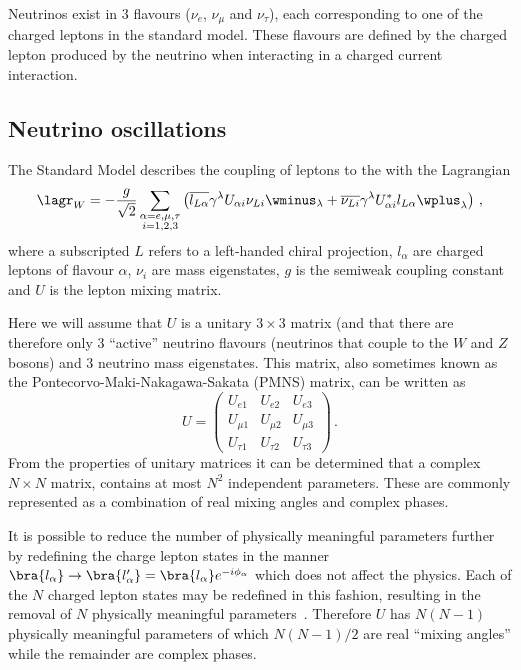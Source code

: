 Neutrinos exist in 3 flavours ($\nu_{e}$, $\nu_{\mu}$ and $\nu_{\tau}$), each corresponding to one of the charged leptons in the standard model.
These flavours are defined by the charged lepton produced by the neutrino when interacting in a charged current interaction.

\subsection{Neutrino oscillations}
\label{sec:theory:theory:oscillations}


The Standard Model describes the coupling of leptons to the \wboson with the Lagrangian
\begin{equation}
  \lagr_{W} = - \frac{g}{\sqrt{2}} \sum_{\substack{\alpha = e, \mu, \tau \\ i = 1, 2, 3}}
  \left( \overline{l_{L\alpha}} \gamma^{\lambda} U_{\alpha i} \nu_{Li} \wminus_{\lambda} +
  \overline{\nu_{Li}} \gamma^{\lambda} U^{*}_{\alpha i} l_{L\alpha} \wplus_{\lambda} \right) \, ,
  \label{eq:lagr}
\end{equation}
where a subscripted $L$ refers to a left-handed chiral projection, $l_{\alpha}$ are charged leptons of flavour $\alpha$, $\nu_{i}$ are mass eigenstates, $g$ is the semiweak coupling constant and $U$ is the lepton mixing matrix.

Here we will assume that $U$ is a unitary $3 \times 3$ matrix (and that there are therefore only 3 ``active'' neutrino flavours (neutrinos that couple to the $W$ and $Z$ bosons) and 3 neutrino mass eigenstates.
This matrix, also sometimes known as the Pontecorvo-Maki-Nakagawa-Sakata (PMNS) matrix, can be written as
\begin{equation}
  U =
  \begin{pmatrix}
    U_{e1}     & U_{e2}     & U_{e3} \\
    U_{\mu 1}  & U_{\mu 2}  & U_{\mu 3} \\
    U_{\tau 1} & U_{\tau 2} & U_{\tau 3}
  \end{pmatrix} \, .
\end{equation}
From the properties of unitary matrices it can be determined that a complex $N \times N$ matrix, contains at most $N^{2}$ independent parameters.
These are commonly represented as a combination of real mixing angles and complex phases.

It is possible to reduce the number of physically meaningful parameters further by redefining the charge lepton states in the manner $\bra{l_{\alpha}} \rightarrow \bra{l_{\alpha}'} = \bra{l_{\alpha}} e^{-i\phi_{\alpha}}$ which does not affect the physics.
Each of the $N$ charged lepton states may be redefined in this fashion, resulting in the removal of $N$ physically meaningful parameters~\cite{kayser2008neutrino}.
Therefore $U$ has $N(N-1)$ physically meaningful parameters of which $N(N-1)/2$ are real ``mixing angles'' while the remainder are complex phases.

